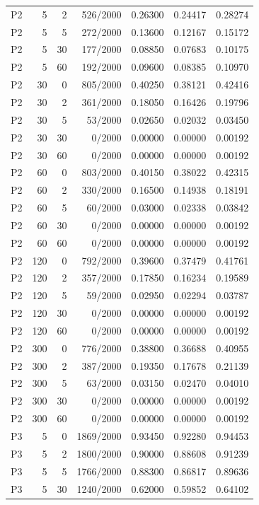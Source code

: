 \begin{tabular}{lrrrrrr}
P2 & 5 & 2 & 526/2000 & 0.26300 & 0.24417 & 0.28274 \\
P2 & 5 & 5 & 272/2000 & 0.13600 & 0.12167 & 0.15172 \\
P2 & 5 & 30 & 177/2000 & 0.08850 & 0.07683 & 0.10175 \\
P2 & 5 & 60 & 192/2000 & 0.09600 & 0.08385 & 0.10970 \\
P2 & 30 & 0 & 805/2000 & 0.40250 & 0.38121 & 0.42416 \\
P2 & 30 & 2 & 361/2000 & 0.18050 & 0.16426 & 0.19796 \\
P2 & 30 & 5 & 53/2000 & 0.02650 & 0.02032 & 0.03450 \\
P2 & 30 & 30 & 0/2000 & 0.00000 & 0.00000 & 0.00192 \\
P2 & 30 & 60 & 0/2000 & 0.00000 & 0.00000 & 0.00192 \\
P2 & 60 & 0 & 803/2000 & 0.40150 & 0.38022 & 0.42315 \\
P2 & 60 & 2 & 330/2000 & 0.16500 & 0.14938 & 0.18191 \\
P2 & 60 & 5 & 60/2000 & 0.03000 & 0.02338 & 0.03842 \\
P2 & 60 & 30 & 0/2000 & 0.00000 & 0.00000 & 0.00192 \\
P2 & 60 & 60 & 0/2000 & 0.00000 & 0.00000 & 0.00192 \\
P2 & 120 & 0 & 792/2000 & 0.39600 & 0.37479 & 0.41761 \\
P2 & 120 & 2 & 357/2000 & 0.17850 & 0.16234 & 0.19589 \\
P2 & 120 & 5 & 59/2000 & 0.02950 & 0.02294 & 0.03787 \\
P2 & 120 & 30 & 0/2000 & 0.00000 & 0.00000 & 0.00192 \\
P2 & 120 & 60 & 0/2000 & 0.00000 & 0.00000 & 0.00192 \\
P2 & 300 & 0 & 776/2000 & 0.38800 & 0.36688 & 0.40955 \\
P2 & 300 & 2 & 387/2000 & 0.19350 & 0.17678 & 0.21139 \\
P2 & 300 & 5 & 63/2000 & 0.03150 & 0.02470 & 0.04010 \\
P2 & 300 & 30 & 0/2000 & 0.00000 & 0.00000 & 0.00192 \\
P2 & 300 & 60 & 0/2000 & 0.00000 & 0.00000 & 0.00192 \\
P3 & 5 & 0 & 1869/2000 & 0.93450 & 0.92280 & 0.94453 \\
P3 & 5 & 2 & 1800/2000 & 0.90000 & 0.88608 & 0.91239 \\
P3 & 5 & 5 & 1766/2000 & 0.88300 & 0.86817 & 0.89636 \\
P3 & 5 & 30 & 1240/2000 & 0.62000 & 0.59852 & 0.64102 \\

\end{tabular}
